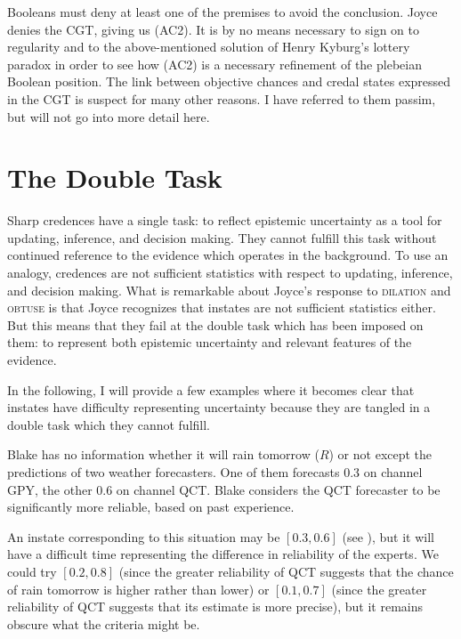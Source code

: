 \documentclass[12pt]{article}
\begin{document}
Booleans must deny at least one of the premises to avoid the
conclusion. Joyce denies the CGT, giving us (AC2). It is by no means
necessary to sign on to regularity and to the above-mentioned solution
of Henry Kyburg's lottery paradox in order to see how (AC2) is a
necessary refinement of the plebeian Boolean position. The link
between objective chances and credal states expressed in the CGT is
suspect for many other reasons. I have referred to them passim, but
will not go into more detail here.

\section{The Double Task}
\label{TheDoubleTask}

Sharp credences have a single task: to reflect epistemic uncertainty
as a tool for updating, inference, and decision making. They cannot
fulfill this task without continued reference to the evidence which
operates in the background. To use an analogy, credences are not
sufficient statistics with respect to updating, inference, and
decision making. What is remarkable about Joyce's response to
\textsc{dilation} and \textsc{obtuse} is that Joyce recognizes that
instates are not sufficient statistics either. But this means that
they fail at the double task which has been imposed on them: to
represent both epistemic uncertainty and relevant features of the
evidence.

In the following, I will provide a few examples where it becomes clear
that instates have difficulty representing uncertainty because they
are tangled in a double task which they cannot fulfill.

\begin{quotex}
  \label{ex:aggreg} Blake has no
  information whether it will rain tomorrow ($R$) or not except the
  predictions of two weather forecasters. One of them forecasts 0.3 on
  channel GPY, the other 0.6 on channel QCT. Blake considers the QCT
  forecaster to be significantly more reliable, based on past
  experience.
\end{quotex}

An instate corresponding to this situation may be $[0.3,0.6]$ (see
), but it will have a difficult time
representing the difference in reliability of the experts. We could
try $[0.2,0.8]$ (since the greater reliability of QCT suggests that
the chance of rain tomorrow is higher rather than lower) or
$[0.1,0.7]$ (since the greater reliability of QCT suggests that its
estimate is more precise), but it remains obscure what the criteria
might be.
\end{document}
